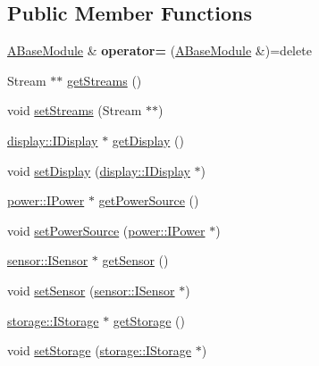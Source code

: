 \subsection*{Public Member Functions}
\begin{DoxyCompactItemize}
\item 
\mbox{\label{classwood_box_1_1module_1_1_a_base_module_a61e8f78a69b3ea735e70a13f6de8d662}} 
\mbox{\hyperlink{classwood_box_1_1module_1_1_a_base_module}{A\+Base\+Module}} \& {\bfseries operator=} (\mbox{\hyperlink{classwood_box_1_1module_1_1_a_base_module}{A\+Base\+Module}} \&)=delete
\item 
Stream $\ast$$\ast$ \mbox{\hyperlink{classwood_box_1_1module_1_1_a_base_module_ada9df5e73cb0aee0bada1de17de19a9c}{get\+Streams}} ()
\item 
void \mbox{\hyperlink{classwood_box_1_1module_1_1_a_base_module_a6e3b73bd36f668f5d621dee3070c131a}{set\+Streams}} (Stream $\ast$$\ast$)
\item 
\mbox{\hyperlink{classwood_box_1_1display_1_1_i_display}{display\+::\+I\+Display}} $\ast$ \mbox{\hyperlink{classwood_box_1_1module_1_1_a_base_module_afecd89a2ed85517a6d72ad2f03ea87c3}{get\+Display}} ()
\item 
void \mbox{\hyperlink{classwood_box_1_1module_1_1_a_base_module_a7e99b7d8d59953a8350e9859a475bc6a}{set\+Display}} (\mbox{\hyperlink{classwood_box_1_1display_1_1_i_display}{display\+::\+I\+Display}} $\ast$)
\item 
\mbox{\hyperlink{classwood_box_1_1power_1_1_i_power}{power\+::\+I\+Power}} $\ast$ \mbox{\hyperlink{classwood_box_1_1module_1_1_a_base_module_a1d67c7b9560b30774878e5b882c4bf0a}{get\+Power\+Source}} ()
\item 
void \mbox{\hyperlink{classwood_box_1_1module_1_1_a_base_module_a117ce9fbbcef048ccde38f0b6a11aa91}{set\+Power\+Source}} (\mbox{\hyperlink{classwood_box_1_1power_1_1_i_power}{power\+::\+I\+Power}} $\ast$)
\item 
\mbox{\hyperlink{classwood_box_1_1sensor_1_1_i_sensor}{sensor\+::\+I\+Sensor}} $\ast$ \mbox{\hyperlink{classwood_box_1_1module_1_1_a_base_module_acd7e95a20964a1f9ce2dbbbf629fe3dc}{get\+Sensor}} ()
\item 
void \mbox{\hyperlink{classwood_box_1_1module_1_1_a_base_module_ac3fd88feae532ca88b14642f76ef8def}{set\+Sensor}} (\mbox{\hyperlink{classwood_box_1_1sensor_1_1_i_sensor}{sensor\+::\+I\+Sensor}} $\ast$)
\item 
\mbox{\hyperlink{classwood_box_1_1storage_1_1_i_storage}{storage\+::\+I\+Storage}} $\ast$ \mbox{\hyperlink{classwood_box_1_1module_1_1_a_base_module_ad55a3509dc2bcb2fc5c8abc4a4db1cf1}{get\+Storage}} ()
\item 
void \mbox{\hyperlink{classwood_box_1_1module_1_1_a_base_module_af9e009af37d04062c2da7d977baded80}{set\+Storage}} (\mbox{\hyperlink{classwood_box_1_1storage_1_1_i_storage}{storage\+::\+I\+Storage}} $\ast$)
\end{DoxyCompactItemize}
